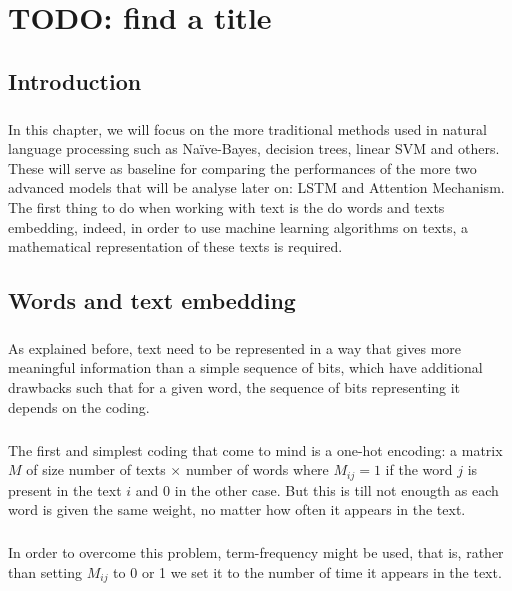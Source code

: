 \chapter{TODO: find a title}
\section{Introduction}
\paragraph{} In this chapter, we will focus on the more traditional methods used in natural language processing such as Naïve-Bayes, decision trees, linear SVM and others. These will serve as baseline for comparing the performances of the more two advanced models that will be analyse later on: LSTM and Attention Mechanism. The first thing to do when working with text is the do words and texts embedding, indeed, in order to use machine learning algorithms on texts, a mathematical representation of these texts is required. 

\section{Words and text embedding}
\paragraph{}  As explained before, text need to be represented in a way that gives more meaningful information than a simple sequence of bits, which have additional drawbacks such that for a given word, the sequence of bits representing it depends on the coding.
\paragraph{} The first and simplest coding that come to mind is a one-hot encoding: a matrix $M$ of size number of texts $\times$ number of words where $M_{ij} = 1$ if the word $j$ is present in the text  $i$ and $0$ in the other case. But this is till not enougth as each word is given the same weight, no matter how often it appears in the text. 

\paragraph{} In order to overcome this problem, term-frequency might be used, that is, rather than setting $M_{ij}$ to 0 or 1 we set it to the number of time it appears in the text.  